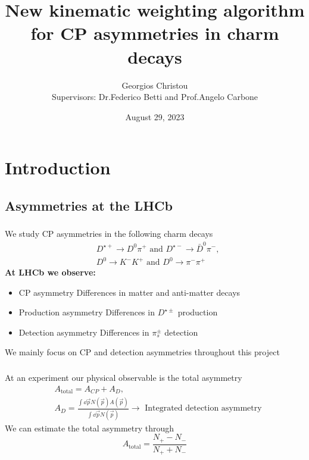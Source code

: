 \documentclass{beamer}
\title[\href{https://summerstudent.web.cern.ch/home}{CERN Summer Student Programme 2023}]
{     
      New kinematic weighting algorithm for CP asymmetries in charm decays
}
\author[\href{https://github.com/GiorgosChr}{Georgios Christou}]
{Georgios Christou
\\
Supervisors: Dr.\@ Federico Betti and Prof.\@ Angelo Carbone}
\institute[\href{https://lhcb.web.cern.ch/}{LHCb}]
{
      LHCb Collaboration
}
\date{August 29, 2023}
\begin{document}
\frame{\titlepage}
\begin{frame}
      \tableofcontents
\end{frame}

\section{Introduction}
\subsection{Asymmetries at the LHCb}

\begin{frame}
      \frametitle{\insertsubsectionhead}
      \rightarrow We study CP asymmetries in the following charm decays
      \begin{eqnarray*}
            &D^{\star+}\to D^0\pi^+ \text{ and } D^{\star-}\to \bar{D}^0\pi^-, \nonumber\\
            &D^0 \to K^-K^+ \text{ and } D^0 \to \pi^-\pi^+
    \end{eqnarray*}
      \textbf{At LHCb we observe:}
      \begin{itemize}
            \item CP asymmetry \rightarrow Differences in matter and anti-matter decays
            \item Production asymmetry \rightarrow Differences in $D^{\star\pm}$ production
            \item Detection asymmetry \rightarrow Differences in $\pi_s^{\pm}$ detection
      \end{itemize}
      \bigbreak
      \rightarrow We mainly focus on CP and detection asymmetries throughout this project
\end{frame}

\begin{frame}
      \frametitle{\insertsubsectionhead}
      \rightarrow At an experiment our physical observable is the total asymmetry
      \begin{eqnarray*}
            &A_\text{total} = A_{CP} + A_{D},\nonumber\\
            &A_{D} = \frac{\int \dd \vec{p} N(\vec{p})A(\vec{p})}{\int \dd \vec{p} N(\vec{p})}\to \text{ Integrated detection asymmetry}
      \end{eqnarray*}
      \rightarrow We can estimate the total asymmetry through
      \begin{equation*}
            A_\text{total} = \frac{N_+ - N_-}{N_+ + N_-}
      \end{equation*}
\end{frame}
\end{document}
